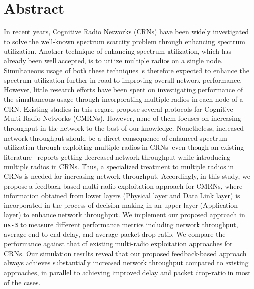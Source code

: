 \chapter*{Abstract}
 In recent years, Cognitive Radio Networks (CRNs) have been widely investigated to solve the well-known spectrum scarcity problem through enhancing spectrum utilization. Another technique of enhancing spectrum utilization, which has already been well accepted, is to utilize multiple radios on a single node. Simultaneous usage of both these techniques is therefore expected to enhance the spectrum utilization further in road to improving overall network performance. However, little research efforts have been spent on investigating performance of the simultaneous usage through incorporating multiple radios in each node of a CRN. Existing studies in this regard propose several protocols for Cognitive Multi-Radio Networks (CMRNs). However, none of them focuses on increasing throughput in the network to the best of our knowledge. Nonetheless, increased network throughput should be a direct consequence of enhanced spectrum utilization through exploiting multiple radios in CRNs, even though an existing literature~\cite{khan2015towards} reports getting decreased network throughput while introducing multiple radios in CRNs. Thus, a specialized treatment to multiple radios in CRNs is needed for increasing network throughput. Accordingly, in this study, we propose a feedback-based multi-radio exploitation approach for CMRNs, where information obtained from lower layers (Physical layer and Data Link layer) is incorporated in the process of decision making in an upper layer (Application layer) to enhance network throughput. We implement our proposed approach in \texttt{ns-3} to measure different performance metrics including network throughput, average end-to-end delay, and average packet drop ratio. We compare the performance against that of existing multi-radio exploitation approaches for CRNs. Our simulation results reveal that our proposed feedback-based approach always achieves substantially increased network throughput compared to existing approaches, in parallel to achieving improved delay and packet drop-ratio in most of the cases.
